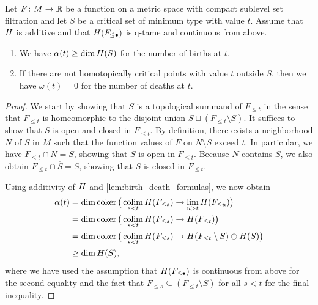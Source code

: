 \begin{lem}
\label{lem:minimum_type_implies_some_birth_and_no_death}
	Let $F \colon M \to \mathbb{R}$ be a function on a metric space with compact sublevel set filtration and let $S$ be a critical set of minimum type with value $t$. 
	Assume that $H$ is additive and that $H(F_{\leq \bullet})$ is q-tame and continuous from above.
	\begin{enumerate}
		\item We have $\alpha(t) \geq \dim H(S)$ for the number of births at $t$.
		\item If there are not homotopically critical points with value $t$ outside $S$, then we have $\omega(t) = 0$ for the number of deaths at $t$.
	\end{enumerate}
\end{lem}
\begin{proof}
	We start by showing that $S$ is a topological summand of $F_{\leq t}$ in the sense that $F_{\leq t}$ is homeomorphic to the disjoint union $S \sqcup (F_{\leq t} \setminus S)$.
	It suffices to show that $S$ is open and closed in $F_{\leq t}$.
	By definition, there exists a neighborhood $N$ of $\overline{S}$ in $M$ such that the function values of $F$ on $N \setminus S$ exceed $t$. 
	In particular, we have $F_{\leq t} \cap N = S$, showing that $S$ is open in $F_{\leq t}$. 
	Because $N$ contains $\overline{S}$, we also obtain $F_{\leq t} \cap \overline{S} = S$, showing that $S$ is closed in $F_{\leq t}$.
	
	Using additivity of $H$ and \cref{lem:birth_death_formulas}, we now obtain
	\begin{align*}
		\alpha(t) &= \dim \operatorname{coker} \big( \operatorname*{colim}_{s < t} H(F_{\leq s}) \to \lim_{u > t} H(F_{\leq u}) \big) \\
			      &= \dim \operatorname{coker} \big( \operatorname*{colim}_{s < t} H(F_{\leq s}) \to H(F_{\leq t}) \big) \\
			      &= \dim \operatorname{coker} \big( \operatorname*{colim}_{s < t} H(F_{\leq s}) \to H(F_{\leq t} \setminus S) \oplus H(S) \big) \\
			      &\geq \dim H(S),
	\end{align*}
	where we have used the assumption that $H(F_{\leq \bullet})$ is continuous from above for the second equality and the fact that $F_{\leq s} \subseteq (F_{\leq t} \setminus S)$ for all $s < t$ for the final inequality.
	

\end{proof}
